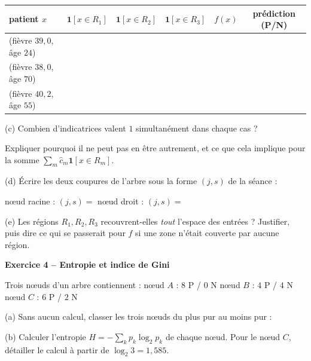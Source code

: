 \documentclass[10pt,a4paper]{article}
\newcommand{\repligne}{\par\vspace{0.42cm}\noindent\dotfill}
\begin{document}
\vspace{0.15cm}
{\small
\renewcommand{\arraystretch}{1.9}
\begin{tabular}{|l|c|c|c|c|c|}
\hline
patient $x$ & $\mathbf{1}[x \in R_1]$ & $\mathbf{1}[x \in R_2]$ & $\mathbf{1}[x \in R_3]$ & $f(x)$ & prédiction (P/N)\\
\hline
(fièvre $39{,}0$, âge $24$) & & & & & \\
\hline
(fièvre $38{,}0$, âge $70$) & & & & & \\
\hline
(fièvre $40{,}2$, âge $55$) & & & & & \\
\hline
\end{tabular}
}

\vspace{0.25cm}
(c) Combien d'indicatrices valent $1$ simultanément dans chaque cas ? \makebox[1.5cm]{\dotfill}

Expliquer pourquoi il ne peut pas en être autrement, et ce que cela implique pour la somme $\sum_m \hat c_m \mathbf{1}[x \in R_m]$.
\repligne
\repligne
\repligne
\repligne

\vspace{0.25cm}
(d) Écrire les deux coupures de l'arbre sous la forme $(j, s)$ de la séance :

\vspace{0.2cm}
nœud racine : $(j, s) = $ \makebox[5cm]{\dotfill} \qquad nœud droit : $(j, s) = $ \makebox[5cm]{\dotfill}

\vspace{0.25cm}
(e) Les régions $R_1, R_2, R_3$ recouvrent-elles \emph{tout} l'espace des entrées ? Justifier, puis dire ce qui se passerait pour $f$ si une zone n'était couverte par aucune région.
\repligne
\repligne
\repligne

\vspace{0.5cm}

\textbf{\large Exercice 4 -- Entropie et indice de Gini}

\vspace{0.15cm}

Trois nœuds d'un arbre contiennent : \quad nœud $A$ : $8$ P / $0$ N \qquad nœud $B$ : $4$ P / $4$ N \qquad nœud $C$ : $6$ P / $2$ N

\vspace{0.2cm}
(a) Sans aucun calcul, classer les trois nœuds du plus pur au moins pur : \makebox[5cm]{\dotfill}

\vspace{0.2cm}
(b) Calculer l'entropie $H = -\sum_k p_k \log_2 p_k$ de chaque nœud. Pour le nœud $C$, détailler le calcul à partir de $\log_2 3 = 1{,}585$.
\end{document}
